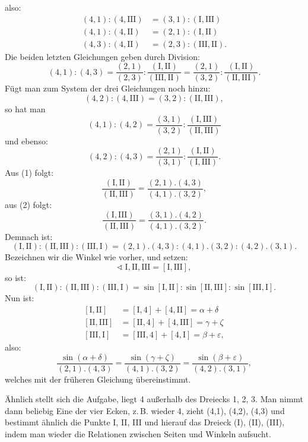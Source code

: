 also:
\[
\begin{array}{rl}
(4,1) : (4,\text{III}) & = (3,1) : (\text{I}, \text{III}) \\
(4,1) : (4,\text{II}) & = (2,1) : (\text{I}, \text{II}) \\
(4,3) : (4,\text{II}) & = (2,3) : (\text{III}, \text{II}).
\end{array}
\]
Die beiden letzten Gleichungen geben durch Division:
\begin{equation}
(4,1) : (4,3) = \frac{(2,1)}{(2,3)} : \frac{(\text{I}, \text{II})}{(\text{III}, \text{II})}
= \frac{(2,1)}{(3,2)} : \frac{(\text{I}, \text{II})}{(\text{II}, \text{III})}.
\tag{1}
\end{equation}
Fügt man zum System der drei Gleichungen noch hinzu:
\[
(4,2) : (4,\text{III}) = (3,2) : (\text{II}, \text{III}),
\]
so hat man
\begin{equation}
(4,1) : (4,2) = \frac{(3,1)}{(3,2)} : \frac{(\text{I}, \text{III})}{(\text{II}, \text{III})}
\tag{2}
\end{equation}
und ebenso:
\begin{equation}
(4,2) : (4,3) = \frac{(2,1)}{(3,1)} : \frac{(\text{I}, \text{II})}{(\text{I}, \text{III})}.
\tag{3}
\end{equation}
Aus (1) folgt:
\[
\frac{(\text{I}, \text{II})}{(\text{II}, \text{III})} = \frac{(2,1) . (4,3)}{(4,1) . (3,2)},
\]
aus (2) folgt:
\[
\frac{(\text{I}, \text{III})}{(\text{II}, \text{III})} = \frac{(3,1) . (4,2)}{(4,1) . (3,2)}.
\]
Demnach ist:
\[
(\text{I}, \text{II}) : (\text{II}, \text{III}) : (\text{III}, \text{I}) = (2,1) . (4,3) :
(4,1) . (3,2) : (4,2) . (3,1).
\]
Bezeichnen wir die Winkel wie vorher, und setzen:
\[
\sphericalangle\ \text{I}, \text{II}, \text{III} = [\text{I}, \text{III}],
\]
so ist:
\[
(\text{I}, \text{II}) : (\text{II}, \text{III}) : (\text{III}, \text{I}) = \sin[\text{I}, \text{II}] :
\sin[\text{II}, \text{III}] : \sin[\text{III}, \text{I}].
\]
Nun ist:
\[
\begin{array}{rl}
{[\text{I}, \text{II}]} & = [\text{I}, 4] + [4, \text{II}] = \alpha + \delta \\
{[\text{II}, \text{III}]} & = [\text{II}, 4] + [4, \text{III}] = \gamma + \zeta \\
{[\text{III}, \text{I}]} & = [\text{III}, 4] + [4, \text{I}] = \beta + \varepsilon,
\end{array}
\]
also:
\[
\frac{\sin(\alpha+\delta)}{(2,1) . (4,3)} = \frac{\sin(\gamma+\zeta)}{(4,1) . (3,2)} =
\frac{\sin(\beta+\varepsilon)}{(4,2) . (3,1)},
\]
welches mit der früheren Gleichung übereinstimmt.

Ähnlich stellt sich die Aufgabe, liegt 4 außerhalb des Dreiecks 1, 2, 3. Man nimmt dann beliebig
Eine der vier Ecken, z.\,B. wieder 4, zieht (4,1), (4,2), (4,3) und bestimmt ähnlich die Punkte
I, II, III und hierauf das Dreieck (I), (II), (III), indem man wieder die Relationen zwischen
Seiten und Winkeln aufsucht.
